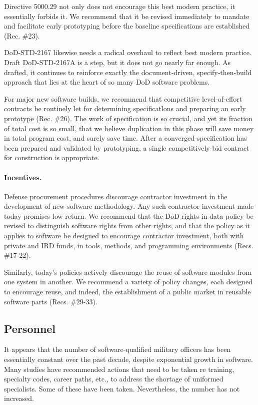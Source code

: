 \documentclass[12pt,final]{article}
\begin{document}
Directive 5000.29 not only does not encourage this best modern practice, it
essentially forbids it. We recommend that it be revised immediately to mandate
and facilitate early prototyping before the baseline specifications are
established (Rec. \#23).

DoD-STD-2167 likewise needs a radical overhaul to reflect best modern practice.
Draft DoD-STD-2167A is a step, but it does not go nearly far enough. As
drafted, it continues to reinforce exactly the document-driven,
specify-then-build approach that lies at the heart of so many DoD software
problems.

For major new software builds, we recommend that competitive level-of-effort
contracts be routinely let for determining specificatlons and preparing an
early prototype (Rec. \#26). The work of specification is so crucial, and yet
its fraction of total cost is so small, that we believe duplication in this
phase will save money in total program cost, and surely save time. After a
converged-specification has been prepared and validated by prototyping, a
single competitively-bid contract for construction is appropriate.

\paragraph{Incentives.} Defense procurement procedures discourage contractor
investment in the development of new software methodology. Any such contractor
investment made today promises low return. We recommend that the DoD
rights-in-data policy be revised to distinguish software rights from other
rights, and that the policy as it applies to software be designed to encourage
contractor investment, both with private and IRD funds, in tools, methods, and
programming environments (Recs. \#17-22).

Similarly, today’s policies actively discourage the reuse of software modules
from one system in another. We recommend a variety of policy changes, each
designed to encourage reuse, and indeed, the establishment of a public market
in reusable software parts (Recs. \#29-33).

\subsection*{Personnel}

It appears that the number of software-qualified military officers has been
essentially constant over the past decade, despite exponential growth in
software. Many studies have recommended actions that need to be taken re
training, specialty codes, career paths, etc., to address the shortage of
uniformed specialists. Some of these have been taken.  Nevertheless, the number
has not increased.
\end{document}
